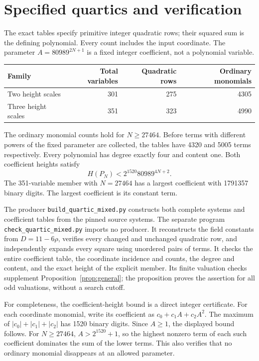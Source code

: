 \documentclass[11pt,a4paper]{article}
\theoremstyle{remark}\newtheorem{remark}[theorem]{Remark}
\begin{document}
\section{Specified quartics and verification}
The exact tables specify primitive integer quadratic rows; their squared
sum is the defining polynomial. Every count includes the input coordinate.
The parameter $A=80989^{2N+1}$ is a fixed integer coefficient, not a
polynomial variable.
\begin{center}
\begin{tabular}{lrrr}
\toprule
Family&Total variables&Quadratic rows&Ordinary monomials\\
\midrule
Two height scales&301&275&4305\\
Three height scales&351&323&4990\\
\bottomrule
\end{tabular}
\end{center}
The ordinary monomial counts hold for $N\ge27464$. Before terms with
different powers of the fixed parameter are collected, the tables have
4320 and 5005 terms respectively. Every polynomial has degree exactly
four and content one. Both coefficient heights satisfy
\[
                             H(P_N)<2^{1520}80989^{4N+2}.
\]
The 351-variable member with $N=27464$ has a largest coefficient with
1791357 binary digits. The largest coefficient is its constant term.

The producer \nolinkurl{build_quartic_mixed.py} constructs both complete
systems and coefficient tables from the pinned source systems. The separate
program \nolinkurl{check_quartic_mixed.py} imports no producer. It
reconstructs the field constants from $D=11-6\rho$, verifies every changed
and unchanged quadratic row, and independently expands every square using
unordered pairs of terms. It checks the entire coefficient table, the
coordinate incidence and counts, the degree and content, and the exact
height of the explicit member. Its finite valuation checks supplement
Proposition~\ref{prop:general}; the proposition proves the assertion for
all odd valuations, without a search cutoff.

For completeness, the coefficient-height bound is a direct integer
certificate. For each coordinate monomial, write its coefficient as
$c_0+c_1A+c_2A^2$. The maximum of $|c_0|+|c_1|+|c_2|$ has 1520 binary
digits. Since $A\ge1$, the displayed bound follows. For $N\ge27464$,
$A>2^{1520}+1$, so the highest nonzero term of each such coefficient
dominates the sum of the lower terms. This also verifies that no ordinary
monomial disappears at an allowed parameter.
\end{document}
